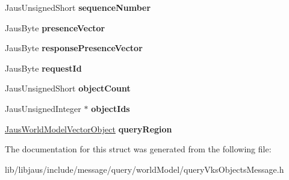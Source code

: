 \begin{DoxyCompactItemize}
\item 
\hypertarget{struct_query_vks_objects_message_struct_a8fa15ab1ee1d6528555ee74be5a9774e}{\-Jaus\-Unsigned\-Short {\bfseries sequence\-Number}}\label{struct_query_vks_objects_message_struct_a8fa15ab1ee1d6528555ee74be5a9774e}

\item 
\hypertarget{struct_query_vks_objects_message_struct_aea3a6dd2054d7cdde55b608837a68a32}{\-Jaus\-Byte {\bfseries presence\-Vector}}\label{struct_query_vks_objects_message_struct_aea3a6dd2054d7cdde55b608837a68a32}

\item 
\hypertarget{struct_query_vks_objects_message_struct_aead102b2fa309b00558f1a50ca16bfdb}{\-Jaus\-Byte {\bfseries response\-Presence\-Vector}}\label{struct_query_vks_objects_message_struct_aead102b2fa309b00558f1a50ca16bfdb}

\item 
\hypertarget{struct_query_vks_objects_message_struct_a977870e0d6012fa3d3d31bb29ee5a73c}{\-Jaus\-Byte {\bfseries request\-Id}}\label{struct_query_vks_objects_message_struct_a977870e0d6012fa3d3d31bb29ee5a73c}

\item 
\hypertarget{struct_query_vks_objects_message_struct_a34436112eabfd0d636120d81713fbe8c}{\-Jaus\-Unsigned\-Short {\bfseries object\-Count}}\label{struct_query_vks_objects_message_struct_a34436112eabfd0d636120d81713fbe8c}

\item 
\hypertarget{struct_query_vks_objects_message_struct_ae4a344fb43db085a1d1c34974338bf82}{\-Jaus\-Unsigned\-Integer $\ast$ {\bfseries object\-Ids}}\label{struct_query_vks_objects_message_struct_ae4a344fb43db085a1d1c34974338bf82}

\item 
\hypertarget{struct_query_vks_objects_message_struct_ae018ec06a4ce8ccc199bae64f580d282}{\hyperlink{struct_jaus_world_model_vector_object_struct}{\-Jaus\-World\-Model\-Vector\-Object} {\bfseries query\-Region}}\label{struct_query_vks_objects_message_struct_ae018ec06a4ce8ccc199bae64f580d282}

\end{DoxyCompactItemize}


\-The documentation for this struct was generated from the following file\-:\begin{DoxyCompactItemize}
\item 
lib/libjaus/include/message/query/world\-Model/query\-Vks\-Objects\-Message.\-h\end{DoxyCompactItemize}
